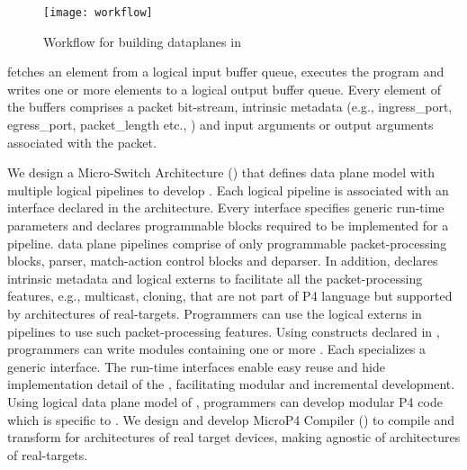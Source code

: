 \documentclass[letterpaper,twocolumn,10pt]{article}
\begin{document}
\begin{figure}[tbh]
  \centering
  \texttt{[image: workflow]}
  \caption{Workflow for building dataplanes in \ulang}
  \label{fig:workflow}
\end{figure}



\uswitch fetches an element from a logical input buffer queue, executes the program and writes one or more elements to a logical output buffer queue.
Every element of the buffers comprises a packet bit-stream, intrinsic metadata (e.g., ingress\_port, egress\_port, packet\_length etc., ) and input arguments or output arguments associated with the packet.


We design a Micro-Switch Architecture (\uarch) that defines data plane model with multiple logical pipelines to develop \uprograms.
Each logical pipeline is associated with an interface declared in the architecture.
Every interface specifies generic run-time parameters and declares programmable blocks required to be implemented for a pipeline.
\uarch data plane pipelines comprise of only programmable packet-processing blocks, parser, match-action control blocks and deparser. 
In addition, \uarch declares intrinsic metadata and logical externs to facilitate all the packet-processing features, e.g., multicast, cloning, that are not part of P4 language but supported by architectures of real-targets. 
Programmers can use the logical externs in \uarch pipelines to use such packet-processing features.
Using constructs declared in \uarch, programmers can write modules containing one or more \uprograms.
Each \uprogram specializes a generic interface.
The run-time interfaces enable easy reuse and hide implementation detail of the \uprograms, facilitating modular and incremental development.
Using logical data plane model of \uarch, programmers can develop modular P4 code which is specific to \uarch.
We design and develop MicroP4 Compiler (\ucomp) to compile and transform \uprogram for architectures of real target devices, making \uprograms agnostic of architectures of real-targets.
\end{document}
